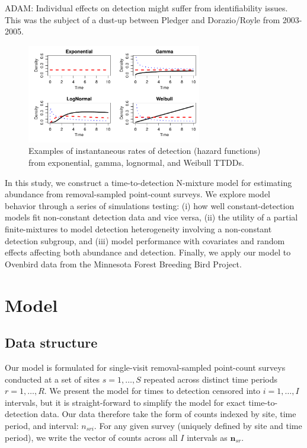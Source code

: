 \documentclass[useAMS,usenatbib,referee,12pt]{article}
\newcommand{\adam}[1]{{\color{blue} ADAM: #1}}
\begin{document}
\adam{Individual effects on detection might suffer from identifiability issues. This was the subject of a dust-up between Pledger and Dorazio/Royle from 2003-2005.}

\begin{figure}[h!]\centering
\includegraphics[width=0.68\textwidth]{Hazards.pdf}
\caption{\label{HazardFxns}  Examples of instantaneous rates of detection (hazard functions) from exponential, gamma, lognormal, and Weibull TTDDs.}
\end{figure}

In this study, we construct a time-to-detection N-mixture model for estimating abundance from removal-sampled point-count surveys.  We explore model behavior through a series of simulations testing: (i) how well constant-detection models fit non-constant detection data and vice versa, (ii) the utility of a partial finite-mixtures to model detection heterogeneity involving a non-constant detection subgroup, and (iii) model performance with covariates and random effects affecting both abundance and detection.  Finally, we apply our model to Ovenbird data from the Minnesota Forest Breeding Bird Project.




\section{Model}\label{sec:model}

\subsection{Data structure}\label{sec:data}

Our model is formulated for single-visit removal-sampled point-count surveys conducted at a set of sites $s=1,\dotso,S$ repeated across distinct time periods $r=1,\dotso,R$.  We present the model for times to detection censored into $i=1,\dotso,I$ intervals, but it is straight-forward to simplify the model for exact time-to-detection data.  Our data therefore take the form of counts indexed by site, time period, and interval: $n_{sri}$.  For any given survey (uniquely defined by site and time period), we write the vector of counts across all $I$ intervals as $\textbf{n}_{sr}$.
\end{document}
